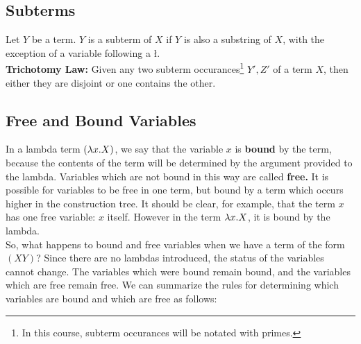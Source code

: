 \subsection{Subterms}
Let $Y$ be a term. $Y$ is a subterm of $X$ if $Y$ is also a substring of $X$, with the exception of a variable following a \l.\\

\noindent\textbf{Trichotomy Law: } Given any two subterm occurances\footnote{In this course, subterm occurances will be notated with primes.} $Y',Z'$ of a term $X$, then either they are disjoint or one contains the other.\\

\subsection{Free and Bound Variables}
In a lambda term $(\lambda x.X)$, we say that the variable $x$ is \textbf{bound} by the term, because the contents of the term will be determined by the argument provided to the lambda. Variables which are not bound in this way are called \textbf{free.} It is possible for variables to be free in one term, but bound by a term which occurs higher in the construction tree. It should be clear, for example, that the term $x$ has one free variable: $x$ itself. However in the term $\lambda x.X$, it is bound by the lambda.\\

So, what happens to bound and free variables when we have a term of the form $(XY)$? Since there are no lambdas introduced, the status of the variables cannot change. The variables which were bound remain bound, and the variables which are free remain free. We can summarize the rules for determining which variables are bound and which are free as follows:\\


